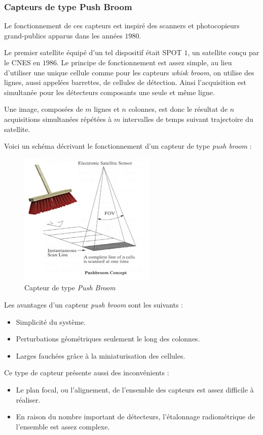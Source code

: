 \documentclass[a4paper, 10pt]{report}
\begin{document}
\subsubsection{Capteurs de type Push Broom}
Le fonctionnement de ces capteurs est inspiré des scanners et photocopieurs grand-publics apparus dans les années $1980$.

Le premier satellite équipé d'un tel dispositif était SPOT $1$, un satellite conçu par le CNES en $1986$.
Le principe de fonctionnement est assez simple, au lieu d'utiliser une unique cellule comme pour les capteurs \emph{whisk broom}, on utilise des lignes, aussi appelées barrettes, de cellules de détection.
Ainsi l'acquisition est simultanée pour les détecteurs composants une seule et même ligne.

Une image, composées de $m$ lignes et $n$ colonnes, est donc le résultat de $n$ acquisitions simultanées répétées à $m$ intervalles de temps suivant trajectoire du satellite.

Voici un schéma décrivant le fonctionnement d'un capteur de type \emph{push broom} :
\begin{figure}[H]
	\begin{center}
		\includegraphics[scale=0.7]{Images/Push_Broom.jpg}
		\caption{Capteur de type \emph{Push Broom}}
	\end{center}
\end{figure}
Les avantages d'un capteur \emph{push broom} sont les suivants :
\begin{itemize}
	\item Simplicité du système.
	\item Perturbations géométriques seulement le long des colonnes.
	\item Larges fauchées grâce à la miniaturisation des cellules.
\end{itemize}
Ce type de capteur présente aussi des inconvénients :
\begin{itemize}
	\item Le plan focal, ou l'alignement, de l'ensemble des capteurs est assez difficile à réaliser.
	\item En raison du nombre important de détecteurs, l'étalonnage radiométrique de l'ensemble est assez complexe.
\end{itemize}
\end{document}
